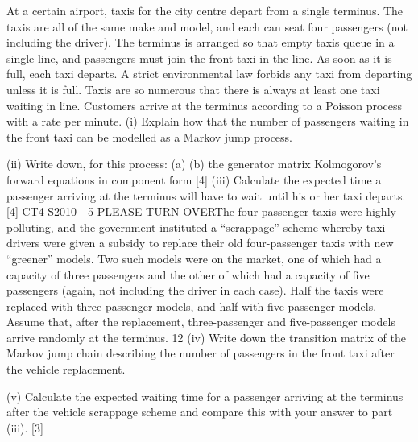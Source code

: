 \documentclass[a4paper,12pt]{article}
\begin{document}
\begin{enumerate}
[Total 11]
At a certain airport, taxis for the city centre depart from a single terminus. The taxis
are all of the same make and model, and each can seat four passengers (not including
the driver). The terminus is arranged so that empty taxis queue in a single line, and
passengers must join the front taxi in the line. As soon as it is full, each taxi departs.
A strict environmental law forbids any taxi from departing unless it is full. Taxis are
so numerous that there is always at least one taxi waiting in line.
Customers arrive at the terminus according to a Poisson process with a rate \beta per
minute.
(i) Explain how that the number of passengers waiting in the front taxi can be
modelled as a Markov jump process.

(ii) Write down, for this process:
(a)
(b)
the generator matrix
Kolmogorov’s forward equations in component form
[4]
(iii)
Calculate the expected time a passenger arriving at the terminus will have to
wait until his or her taxi departs.
[4]
CT4 S2010—5
PLEASE TURN OVERThe four-passenger taxis were highly polluting, and the government instituted a
“scrappage” scheme whereby taxi drivers were given a subsidy to replace their old
four-passenger taxis with new “greener” models. Two such models were on the
market, one of which had a capacity of three passengers and the other of which had a
capacity of five passengers (again, not including the driver in each case). Half the
taxis were replaced with three-passenger models, and half with five-passenger
models.
Assume that, after the replacement, three-passenger and five-passenger models arrive
randomly at the terminus.
12
(iv) Write down the transition matrix of the Markov jump chain describing the
number of passengers in the front taxi after the vehicle replacement.

(v) Calculate the expected waiting time for a passenger arriving at the terminus
after the vehicle scrappage scheme and compare this with your answer to part
(iii).
[3]


\end{enumerate}
\end{document}
